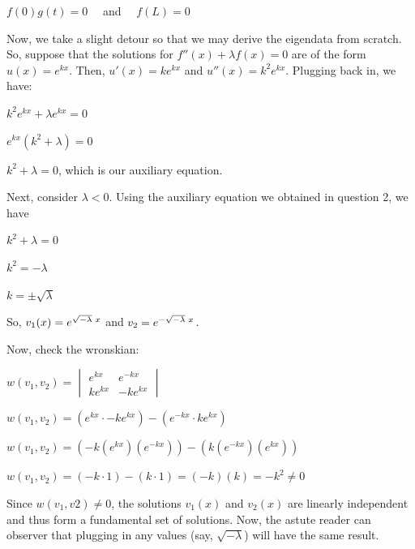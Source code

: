 \documentclass[12pt, executivepaper]{article}
\begin{document}
\begin{flushleft}
\begin{center}
$f(0)g(t)=0 \quad$ and $\quad f(L)=0$

\end{center}

Now, we take a slight detour so that we may derive the eigendata from scratch.
So, suppose that the solutions for $f''(x)+\lambda f(x)=0$ are of the form $u(x)=e^{kx}$. Then, $u'(x)=ke^{kx}$ and $u''(x)=k^2e^{kx}$. Plugging back in, we have:

\begin{center}

$k^2e^{kx}+ \lambda e^{kx}=0$

$e^{kx}(k^2+ \lambda)=0$

$k^2+ \lambda=0$, which is our auxiliary equation.

\end{center}

Next, consider $\lambda < 0$. Using the auxiliary equation we obtained in question 2, we have \\

\begin{center}

$k^2+ \lambda=0$

$k^2=-\lambda$

$k=\pm \sqrt{\lambda}$

\end{center}

So, $v_{1}(x)=e^{\sqrt{-\lambda} \hspace{1mm} x}$ and $v_{2}=e^{-\sqrt{-\lambda} \hspace{1mm} x}$.

\hspace{3mm}

Now, check the wronskian:

\begin{center}

$w(v_{1}, v_{2})=\begin{vmatrix}
e^{kx} & e^{-kx} \\ 
ke^{kx} & -ke^{kx} 
\end{vmatrix}$

$w(v_{1}, v_{2})=(e^{kx} \cdot -ke^{kx})-(e^{-kx} \cdot ke^{kx})$

$w(v_{1}, v_{2})=(-k(e^{kx})(e^{-kx}))-(k(e^{-kx})(e^{kx}))$

$w(v_{1}, v_{2})=(-k \cdot 1)-(k \cdot 1)=(-k)(k)=-k^2 \neq 0$

\end{center}

Since $w(v_{1}, v{2}) \neq 0$, the solutions $v_{1}(x)$ and $v_{2}(x)$ are linearly independent and thus form a fundamental set of solutions. Now, the astute reader can observer that plugging in any values (say, $\sqrt{-\lambda}$) will have the same result.


\end{flushleft}
\end{document}
